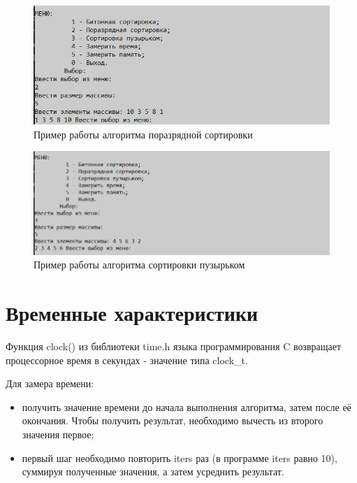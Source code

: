 \begin{figure}[h]
	\begin{center}
		\includegraphics[scale=0.7]{img/example2.png}
	\end{center}
	\captionsetup{justification=centering}
	\caption{Пример работы алгоритма поразрядной сортировки}
	\label{img:example2}
\end{figure}
\clearpage

\begin{figure}[h]
	\begin{center}
		\includegraphics[scale=0.6]{img/example3.png}
	\end{center}
	\captionsetup{justification=centering}
	\caption{Пример работы алгоритма сортировки пузырьком}
	\label{img:example3}
\end{figure}

\section{Временные характеристики}

Функция clock() из библиотеки time.h языка программирования C возвращает процессорное время в секундах - значение типа clock\_t.

Для замера времени:
\begin{itemize}
	\item получить значение времени до начала выполнения алгоритма, затем после её окончания. Чтобы получить результат, необходимо вычесть из второго значения первое;
	\item первый шаг необходимо повторить iters раз (в программе iters равно 10), суммируя полученные значения, а затем усреднить результат.
\end{itemize}

